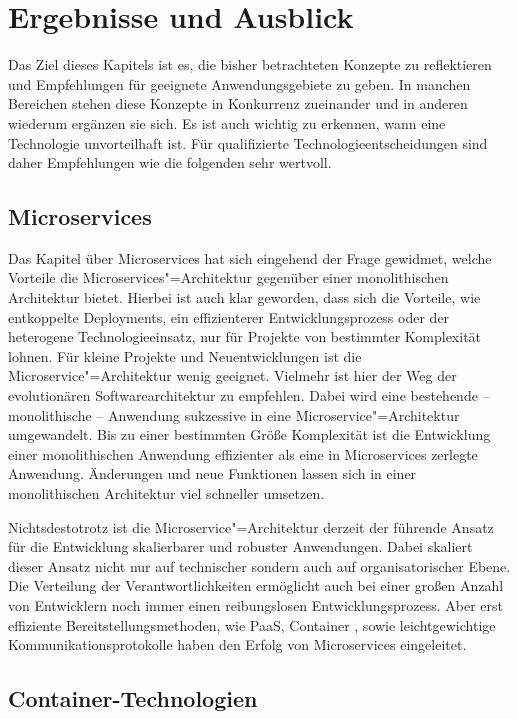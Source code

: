 \chapter{Ergebnisse und Ausblick}
\label{chap:summary}

Das Ziel dieses Kapitels ist es, die bisher betrachteten Konzepte zu reflektieren und Empfehlungen für geeignete Anwendungsgebiete zu geben. In manchen Bereichen stehen diese Konzepte in Konkurrenz zueinander und in anderen wiederum ergänzen sie sich. Es ist auch wichtig zu erkennen, wann eine Technologie unvorteilhaft ist. Für qualifizierte Technologieentscheidungen sind daher Empfehlungen wie die folgenden sehr wertvoll. 

\section{Microservices}

Das Kapitel über Microservices hat sich eingehend der Frage gewidmet, welche Vorteile die Microservices"=Architektur gegenüber einer monolithischen Architektur bietet. Hierbei ist auch klar geworden, dass sich die Vorteile, wie entkoppelte Deployments, ein effizienterer Entwicklungsprozess oder der heterogene Technologieeinsatz, nur für Projekte von bestimmter Komplexität lohnen. Für kleine Projekte und Neuentwicklungen ist die Microservice"=Architektur wenig geeignet. Vielmehr ist hier der Weg der evolutionären Softwarearchitektur zu empfehlen. Dabei wird eine bestehende -- \zB monolithische -- Anwendung sukzessive in eine Microservice"=Architektur umgewandelt. Bis zu einer bestimmten Größe \bzw Komplexität ist die Entwicklung einer monolithischen Anwendung effizienter als eine in Microservices zerlegte Anwendung. Änderungen und neue Funktionen lassen sich in einer monolithischen Architektur viel schneller umsetzen.

Nichtsdestotrotz ist die Microservice"=Architektur derzeit der führende Ansatz für die Entwicklung skalierbarer und robuster Anwendungen. Dabei skaliert dieser Ansatz nicht nur auf technischer sondern auch auf organisatorischer Ebene. Die Verteilung der Verantwortlichkeiten ermöglicht auch bei einer großen Anzahl von Entwicklern noch immer einen reibungslosen Entwicklungsprozess. Aber erst effiziente Bereitstellungsmethoden, wie PaaS, Container \ua, sowie leichtgewichtige Kommunikationsprotokolle haben den Erfolg von Microservices eingeleitet.

\section{Container-Technologien}


